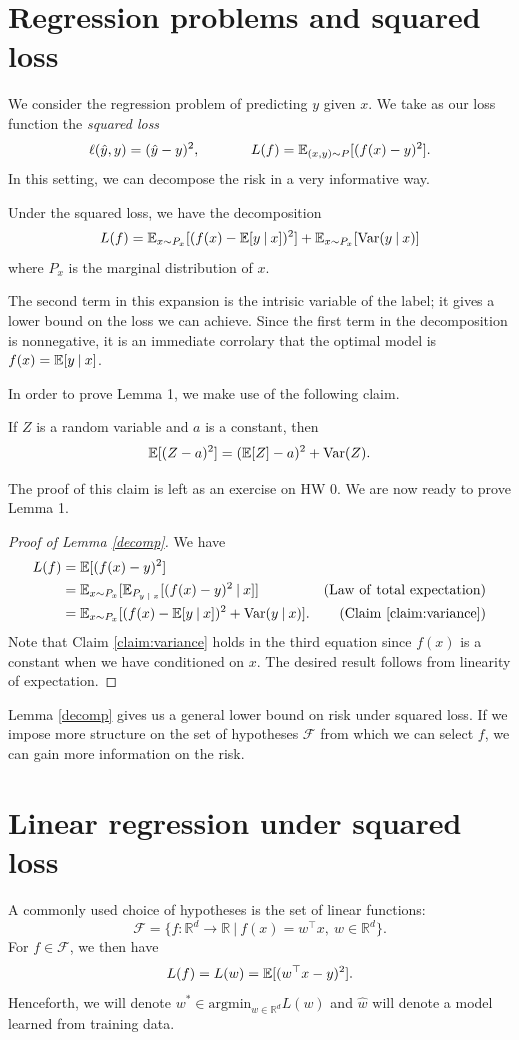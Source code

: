 \documentclass[]{subook}
\begin{document}
\section{Regression problems and squared loss}
We consider the regression problem of predicting $y$ given $x$. We take as our loss function the \textit{squared loss} $$\ell(\hat{y},y) = (\hat{y}-y)^2, \hspace{.5in} L(f) = \mathbb{E}_{(x,y)\sim P}[(f(x)-y)^2].$$ In this setting, we can decompose the risk in a very informative way.
\begin{lemma} \label{decomp}
Under the squared loss, we have the decomposition $$L(f) = \mathbb{E}_{x\sim P_x} [(f(x)-\mathbb{E}[y \: | \: x])^2] + \mathbb{E}_{x\sim P_x}[\mathrm{Var}(y\: | \:x)]$$ where $P_x$ is the marginal distribution of $x$.
\end{lemma}
The second term in this expansion is the intrisic variable of the label; it gives a lower bound on the loss we can achieve. Since the first term in the decomposition is nonnegative, it is an immediate corrolary that the optimal model is $f(x) = \mathbb{E}[y \: | \: x]$.

In order to prove Lemma 1, we make use of the following claim.
\begin{center}
    If $Z$ is a random variable and $a$ is a constant, then $$\mathbb{E}[(Z-a)^2] = (\mathbb{E}[Z]-a)^2 + \mathrm{Var}(Z).$$
\end{center}


The proof of this claim is left as an exercise on HW 0. We are now ready to prove Lemma 1.
\begin{proof}[Proof of Lemma \ref{decomp}]
We have
\begin{align*}
    L(f) &= \mathbb{E}[(f(x)-y)^2] \\
    &= \mathbb{E}_{x\sim P_x}[\mathbb{E}_{P_{y \; | \;x}}[(f(x)-y)^2\: | \: x]] & \mathrm{(Law~{} of~{} total~{} expectation)} \\
    &= \mathbb{E}_{x\sim P_x}[(f(x)-\mathbb{E}[y \: | \: x])^2 + \mathrm{Var}(y \: | \: x)]. & \mathrm{(Claim~{} \ref{claim:variance})}
\end{align*}
Note that Claim \ref{claim:variance} holds in the third equation since $f(x)$ is a constant when we have conditioned on $x$. The desired result follows from linearity of expectation.
\end{proof}
Lemma \ref{decomp} gives us a general lower bound on risk under squared loss. If we impose more structure on the set of hypotheses $\mathcal{F}$ from which we can select $f$, we can gain more information on the risk.

\section{Linear regression under squared loss}
A commonly used choice of hypotheses is the set of linear functions: $$\mathcal{F} = \{f: \mathbb{R}^d \rightarrow \mathbb{R} \: | \: f(x) = w^\top x, \: w\in \mathbb{R}^d\}.$$ For $f\in\mathcal{F}$, we then have $$L(f) = L(w) = \mathbb{E}[(w^\top x-y)^2].$$ Henceforth, we will denote $w^* \in \mathrm{argmin}_{w\in\mathbb{R}^d} L(w)$ and $\hat{w}$ will denote a model learned from training data.
\end{document}
